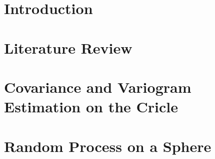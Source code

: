 \documentclass[phd]{uncgdissertation}
\begin{document}
\tableofcontents %


\listoftables   


\listoffigures   


\mainmatter %


\chapter{Introduction}


\chapter{Literature Review}



\chapter{Covariance and Variogram Estimation on the Cricle}


\chapter{Random Process on a Sphere}


\end{document}
